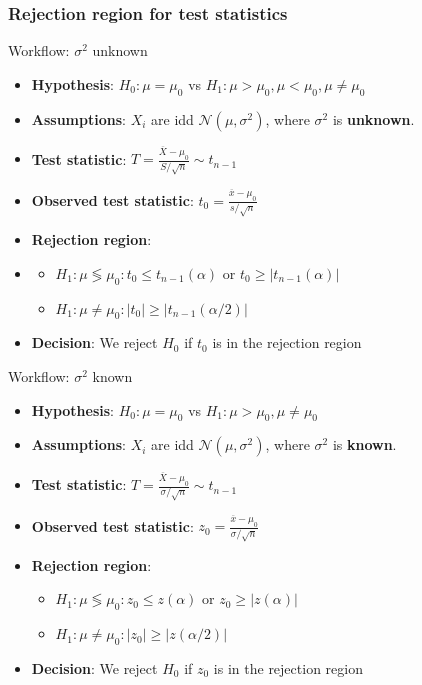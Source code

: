 \documentclass[a4paper]{article}
\begin{document}
\subsubsection{Rejection region for test statistics}
\begin{redbox}{Workflow: \( \sigma^2 \) unknown}
	\begin{itemize}
		\item \textbf{Hypothesis}: \( H_0: \mu = \mu_0 \) vs \( H_1: \mu > \mu_0, \mu < \mu_0, \mu \neq \mu_0 \)
		\item \textbf{Assumptions}: \( X_i \) are idd \( \mathcal{N}(\mu,\sigma^2) \), where \( \sigma^2 \) is \textcolor{myblue}{\textbf{unknown}}.
		\item \textbf{Test statistic}: \( T = \frac{\overline{X}-\mu_0}{S/\sqrt{n}} \sim t_{n-1} \)
		\item \textbf{Observed test statistic}: \( t_0 = \frac{\overline{x}-\mu_0}{s/\sqrt{n}} \)
		\item \textbf{Rejection region}:
		\item \begin{itemize}
			\item \( H_1: \mu \lessgtr \mu_0: t_0 \leq t_{n-1}(\alpha) \) or \( t_0 \geq \lvert t_{n-1}(\alpha) \rvert \)
			\item \( H_1: \mu \neq \mu_0: \lvert t_0 \rvert \geq \lvert t_{n-1} (\alpha / 2) \rvert \) 
		\end{itemize}
		\item \textbf{Decision}: We reject \( H_0 \) if \( t_0 \) is in the rejection region
	\end{itemize}
\end{redbox}
\begin{redbox}{Workflow: \( \sigma^2 \) known}
	\begin{itemize}
		\item \textbf{Hypothesis}: \( H_0: \mu = \mu_0 \) vs \( H_1: \mu > \mu_0, \mu \neq \mu_0 \)
		\item \textbf{Assumptions}: \( X_i \) are idd \( \mathcal{N}(\mu,\sigma^2) \), where \( \sigma^2 \) is \textcolor{myblue}{\textbf{known}}.
		\item \textbf{Test statistic}: \( T = \frac{\overline{X}-\mu_0}{\sigma/\sqrt{n}} \sim t_{n-1} \)
		\item \textbf{Observed test statistic}: \( z_0 = \frac{\overline{x}-\mu_0}{\sigma/\sqrt{n}} \)
		\item \textbf{Rejection region}:
		\begin{itemize}
			\item \( H_1: \mu \lessgtr \mu_0: z_0 \leq z(\alpha) \) or \( z_0 \geq \lvert z(\alpha) \rvert \)
			\item \( H_1: \mu \neq \mu_0: \lvert z_0 \rvert \geq \lvert z(\alpha / 2) \rvert \) 
		\end{itemize}
		\item \textbf{Decision}: We reject \( H_0 \) if \( z_0 \) is in the rejection region
	\end{itemize}
\end{redbox}
\end{document}
